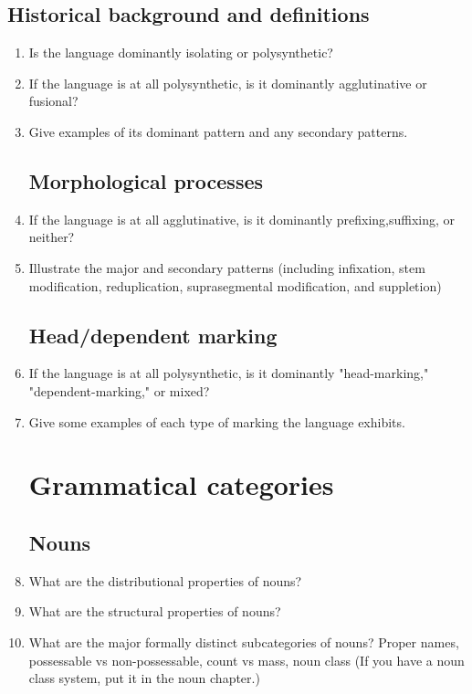 \documentclass[twocolumn]{scrartcl}
\begin{document}
\subsection{Historical background and definitions}
\begin{enumerate}[resume]
\item Is the language dominantly isolating or polysynthetic?
\item If the language is at all polysynthetic, is it dominantly agglutinative or fusional?
\item Give examples of its dominant pattern and any secondary patterns.
\subsection{Morphological processes}
\item If the language is at all agglutinative, is it dominantly prefixing,suffixing, or neither?
\item Illustrate the major and secondary patterns (including infixation, stem modification, reduplication, suprasegmental modification, and suppletion)
\subsection{Head/dependent marking}
\item If the language is at all polysynthetic, is it dominantly "head-marking," "dependent-marking," or mixed?
\item Give some examples of each type of marking the language exhibits.
\section{Grammatical categories}
\subsection{Nouns}
\item What are the distributional properties of nouns? 
\item What are the structural properties of nouns?
\item What are the major formally distinct subcategories of nouns? 
\subitem Proper names, possessable vs non-possessable, count vs mass, noun class (If you have a noun class system, put it in the noun chapter.)
\end{enumerate}
\end{document}
